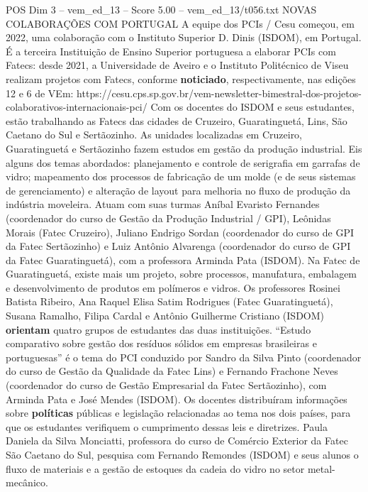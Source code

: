 \begin{textsample}{POS Dim 3 – vem\_ed\_13 – Score 5.00 – vem\_ed\_13/t056.txt}  \label{ex:f3_pos_129}
NOVAS COLABORAÇÕES COM PORTUGAL A equipe dos PCIs / Cesu começou, em 2022, uma colaboração com o Instituto Superior D.
Dinis (ISDOM), em Portugal.
É a terceira Instituição de Ensino Superior portuguesa a elaborar PCIs com Fatecs: desde 2021, a Universidade de Aveiro e o Instituto Politécnico de Viseu realizam projetos com Fatecs, conforme \textbf{noticiado}, respectivamente, nas edições 12 e 6 de VEm: https://cesu.cps.sp.gov.br/vem-newsletter-bimestral-dos-projetos-colaborativos-internacionais-pci/ Com os docentes do ISDOM e seus estudantes, estão trabalhando as Fatecs das cidades de Cruzeiro, Guaratinguetá, Lins, São Caetano do Sul e Sertãozinho.
As unidades localizadas em Cruzeiro, Guaratinguetá e Sertãozinho fazem estudos em gestão da produção industrial.
Eis alguns dos temas abordados: planejamento e controle de serigrafia em garrafas de vidro; mapeamento dos processos de fabricação de um molde (e de seus sistemas de gerenciamento) e alteração de layout para melhoria no fluxo de produção da indústria moveleira.
Atuam com suas turmas Aníbal Evaristo Fernandes (coordenador do curso de Gestão da Produção Industrial / GPI), Leônidas Morais (Fatec Cruzeiro), Juliano Endrigo Sordan (coordenador do curso de GPI da Fatec Sertãozinho) e Luiz Antônio Alvarenga (coordenador do curso de GPI da Fatec Guaratinguetá), com a professora Arminda Pata (ISDOM).
Na Fatec de Guaratinguetá, existe mais um projeto, sobre processos, manufatura, embalagem e desenvolvimento de produtos em polímeros e vidros.
Os professores Rosinei Batista Ribeiro, Ana Raquel Elisa Satim Rodrigues (Fatec Guaratinguetá), Susana Ramalho, Filipa Cardal e Antônio Guilherme Cristiano (ISDOM) \textbf{orientam} quatro grupos de estudantes das duas instituições. “Estudo comparativo sobre gestão dos resíduos sólidos em empresas brasileiras e portuguesas” é o tema do PCI conduzido por Sandro da Silva Pinto (coordenador do curso de Gestão da Qualidade da Fatec Lins) e Fernando Frachone Neves (coordenador do curso de Gestão Empresarial da Fatec Sertãozinho), com Arminda Pata e José Mendes (ISDOM).
Os docentes distribuíram informações sobre \textbf{políticas} públicas e legislação relacionadas ao tema nos dois países, para que os estudantes verifiquem o cumprimento dessas leis e diretrizes.
Paula Daniela da Silva Monciatti, professora do curso de Comércio Exterior da Fatec São Caetano do Sul, pesquisa com Fernando Remondes (ISDOM) e seus alunos o fluxo de materiais e a gestão de estoques da cadeia do vidro no setor metal-mecânico.

\end{textsample}
